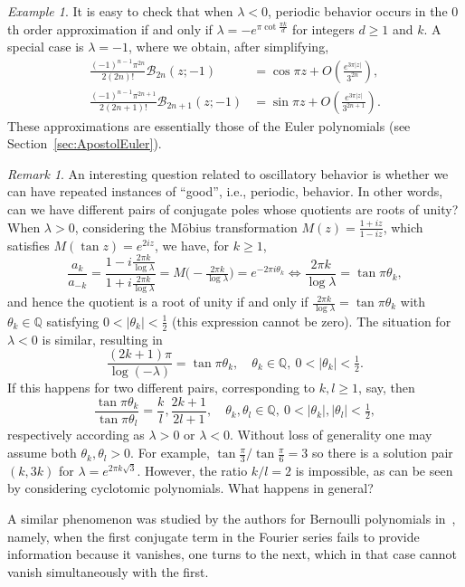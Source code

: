 \documentclass[11pt,a4paper]{amsart}
\newcommand{\Q}{\mathbb{Q}}
\newcommand{\B}{\mathcal{B}}
\theoremstyle{plain}
\theoremstyle{remark}
\newtheorem{remark}{Remark}
\newtheorem{example}{Example}
\begin{document}
\begin{example}
\label{ex:l=-1}
It is easy to check that when $\lambda < 0$, periodic behavior occurs in the $0$th order approximation if and only if $\lambda = -e^{\pi \cot \frac{\pi k}{d}}$ for integers
$d \geq 1$ and $k$.
A special case is $\lambda = -1$, where we obtain, after simplifying,
%
\begin{equation}
\label{eq:l=-1}
\begin{aligned}
	   \frac{(-1)^{n-1}\pi^{2n}}{2(2n)!} \B_{2n}(z;-1) 
	&= \cos\pi z + O\left(\frac{e^{3\pi |z|}}{3^{2n}}\right),
	\\
	   \frac{(-1)^{n-1}\pi^{2n+1}}{2(2n+1)!} \B_{2n+1}(z;-1) 
	&= \sin\pi z + O\left(\frac{e^{3\pi |z|}}{3^{2n+1}}\right).
\end{aligned}\end{equation}
%
These approximations are essentially those of the Euler polynomials (see Section~\ref{sec:ApostolEuler}).
\end{example}


\begin{remark}
\label{eq:succesive-periods}
An interesting question related to oscillatory behavior is whether we can have repeated instances of ``good'', i.e., periodic, behavior. In other words, can we have different pairs of conjugate poles whose quotients are roots of unity? When $\lambda > 0$, considering the M\"obius transformation $M(z) = \frac{1 + iz}{1 - iz}$, which satisfies
$M(\tan z) = e^{2iz}$, we have, for $k \geq 1$,
$$
	  \frac{a_{k}}{a_{-k}}
	= \frac{1 - i \frac{2\pi k}{\log\lambda}}{1 + i \frac{2\pi k}{\log\lambda}}
	= M \bigl(-\tfrac{2\pi k}{\log\lambda}\bigr)
	= e^{-2\pi i \theta_{k}}
	\iff
	\frac{2\pi k}{\log\lambda} = \tan \pi \theta_{k},
$$
and hence the quotient is a root of unity if and only if $\frac{2\pi k}{\log\lambda} = \tan\pi \theta_{k}$ with $\theta_{k}  \in \Q$ satisfying $0 < |\theta_{k}| < \frac{1}{2}$ (this expression cannot be zero). The situation for $\lambda < 0$ is similar, resulting in
$$
	\frac{(2k + 1)\pi}{\log(-\lambda)} = \tan \pi \theta_{k},
	\quad
	\theta_{k} \in \Q,\
	0 < |\theta_{k}| < \tfrac{1}{2}.
$$
If this happens for two different pairs, corresponding to $k,l \geq 1$, say, then
$$
	\frac{\tan \pi \theta_{k}}{\tan \pi \theta_{l}} = \frac{k}{l}, \frac{2k+1}{2l+1},
	\quad
	\theta_{k},\theta_{l} \in \Q, \
	0 < |\theta_{k}|,|\theta_{l}| < \tfrac{1}{2},
$$
respectively according as $\lambda > 0$ or $\lambda < 0$. 
Without loss of generality one may assume both $\theta_{k},\theta_{l} > 0$.
For example, $\tan \frac{\pi}{3} / \tan \frac{\pi}{6} = 3$ so there is a solution pair
$(k,3k)$ for $\lambda = e^{2 \pi k \sqrt{3}}$.
However, the ratio $k/l = 2$ is impossible, as can be seen by considering cyclotomic polynomials. What happens in general? 

A similar phenomenon was studied by the authors for Bernoulli polynomials in~\cite{NRV-JAT}, namely, when the first conjugate term in the Fourier series fails to provide information because it vanishes, one turns to the next, which in that case cannot vanish simultaneously with the first.
\end{remark}
\end{document}
